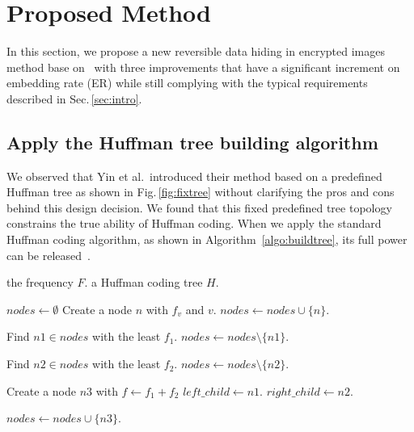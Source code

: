 \section{Proposed Method}
\label{sec:ours}

In this section, we propose a new reversible data hiding in encrypted images method base on~\cite{Yin2020} with three improvements that have a significant increment on embedding rate (ER) while still complying with the typical requirements described in Sec.\,\ref{sec:intro}. 




\subsection{Apply the Huffman tree building algorithm}
\label{sec:improvetree}

We observed that Yin et al.\ introduced their method based on a predefined Huffman tree as shown in Fig.\,\ref{fig:fixtree} 
without clarifying the pros and cons behind this design decision. 
We found that this fixed predefined tree topology constrains the true ability of Huffman coding. 
When we apply the standard Huffman coding algorithm, as shown in Algorithm~\ref{algo:buildtree}, its full power can be released~\cite{IRE1952, Leeuwen2008a}.

\begin{algorithm}
	\caption{Build a Huffman coding tree.}
	\label{algo:buildtree}
	
	\begin{algorithmic}[1]
		\Require the frequency $F$.
		\Ensure a Huffman coding tree $H$.
		
		\State $nodes \gets \emptyset$
		\State Create a node $n$ with $f_v$ and $v$.
		\State $nodes \gets nodes \cup \{n\}$.
		\EndFor
		
		\State Find $n1 \in nodes$ with the least $f_1$.
		\State $nodes \gets nodes \setminus \{n1\}$.
		
		\State Find $n2 \in nodes$ with the least $f_2$.
		\State $nodes \gets nodes \setminus \{n2\}$.
		
		\State Create a node $n3$ with 
		\State\hspace{\algorithmicindent} $f \leftarrow f_1 + f_2$
		\State\hspace{\algorithmicindent} $left\_child \leftarrow n1$.
		\State\hspace{\algorithmicindent} $right\_child \leftarrow n2$.
		
		\State $nodes \gets nodes \cup \{n3\}$.
		\EndWhile
	\end{algorithmic}
\end{algorithm}


